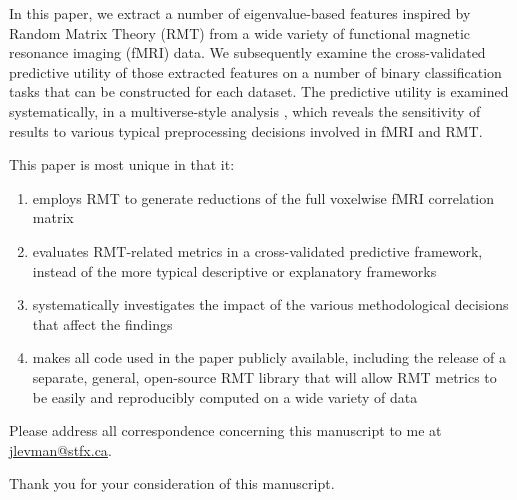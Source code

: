 \documentclass[10pt,letter]{article}
\begin{document}
In this paper, we extract a number of eigenvalue-based features inspired by
Random Matrix Theory (RMT) from a wide variety of functional magnetic resonance
imaging (fMRI) data. We subsequently examine the cross-validated predictive
utility of those extracted features on a number of binary classification tasks
that can be constructed for each dataset. The predictive utility is examined
systematically, in a  multiverse-style analysis
\citep{steegenIncreasingTransparencyMultiverse2016}, which reveals the
sensitivity of results to various typical preprocessing decisions involved in
fMRI and RMT.

This paper is most unique in that it:

\begin{enumerate}
  \item employs RMT to generate reductions of the full voxelwise fMRI
        correlation matrix
  \item evaluates RMT-related metrics in a cross-validated predictive
        framework, instead of the more typical descriptive or explanatory
        frameworks
  \item systematically investigates the impact of the various methodological
        decisions that affect the findings
  \item makes all code used in the paper publicly available, including the release of a
        separate, general, open-source RMT
        library \citep{dm-bergerStfxecutablesEmpyricalRMTV12022} that will allow
        RMT metrics to be easily and reproducibly computed on a wide variety of
        data
\end{enumerate}

Please address all correspondence concerning this manuscript to me at \href{jlevman@stfx.ca}{jlevman@stfx.ca}.

Thank you for your consideration of this manuscript.






\end{document}
